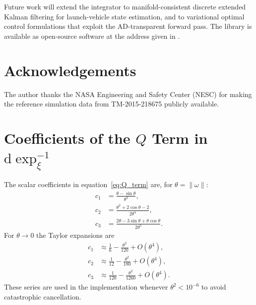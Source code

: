 \documentclass[a4paper,10pt]{article}
\newcommand{\dexp}{\mathrm{d}\exp}
\newcommand{\norm}[1]{\left\lVert #1 \right\rVert}
\theoremstyle{definition}
\begin{document}
Future work will extend the integrator to manifold-consistent discrete extended
Kalman filtering for launch-vehicle state estimation, and to variational optimal
control formulations that exploit the AD-transparent forward pass.  The library
is available as open-source software at the address given in
\citet{aetherion_2025}.

\section*{Acknowledgements}

The author thanks the NASA Engineering and Safety Center (NESC) for making the
reference simulation data from TM-2015-218675 publicly available.




\appendix

\section{Coefficients of the $Q$ Term in $\dexp^{-1}_\xi$}
\label{app:dexp_coeffs}

The scalar coefficients in equation~\eqref{eq:Q_term} are, for
$\theta = \norm{\omega}$:
\begin{align}
  c_1 &= \frac{\theta - \sin\theta}{\theta^3}, \\
  c_2 &= \frac{\theta^2 + 2\cos\theta - 2}{2\theta^4}, \\
  c_3 &= \frac{2\theta - 3\sin\theta + \theta\cos\theta}{2\theta^5}.
\end{align}
For $\theta \to 0$ the Taylor expansions are
\begin{align}
  c_1 &\approx \tfrac{1}{6} - \tfrac{\theta^2}{120} + O(\theta^4), \\
  c_2 &\approx \tfrac{1}{12} - \tfrac{\theta^2}{180} + O(\theta^4), \\
  c_3 &\approx \tfrac{1}{120} - \tfrac{\theta^2}{1260} + O(\theta^4).
\end{align}
These series are used in the implementation whenever $\theta^2 < 10^{-6}$ to
avoid catastrophic cancellation.
\end{document}
